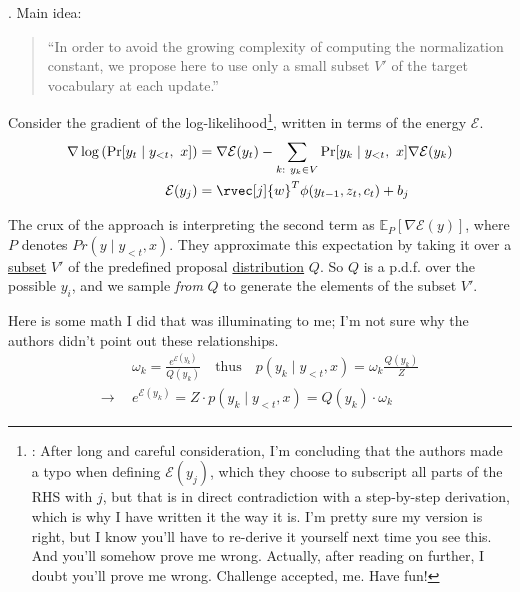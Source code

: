 \documentclass[11pt]{article}
\begin{document}
\myspace
\p {}. Main idea:
\vspace{-1em}
\begin{center}
	\begin{quote}
		{\footnotesize ``In order to avoid the growing complexity of computing the normalization constant, we propose here to use only a small subset $V'$ of the target vocabulary at each update.''}
	\end{quote}
\end{center}
Consider the gradient of the log-likelihood\footnote{: After long and careful consideration, I'm concluding that the authors made a typo when defining $\mathcal{E}(y_j)$, which they choose to subscript all parts of the RHS with $j$, but that is in direct contradiction with a step-by-step derivation, which is why I have written it the way it is. I'm pretty sure my version is right, but I know you'll have to re-derive it yourself next time you see this. And you'll somehow prove me wrong. Actually, after reading on further, I doubt you'll prove me wrong. Challenge accepted, me. Have fun!}, written in terms of the energy $\mathcal{E}$. 
\begin{align}
\nabla \log\left(\Pr[y_t \mid y_{<t}, ~ x]  \right)
&= \nabla \mathcal{E}(y_t) 
- \sum_{k:~y_k\in V}\Pr[y_k \mid y_{<t}, ~ x]\nabla\mathcal{E}(y_k)\\
\mathcal{E}(y_j) &= \rvec[j]{w}^T \phi(y_{t - 1}, z_t, c_t) + b_j
\end{align}


\myspace
\p The crux of the approach is interpreting the second term as $\mathbb{E}_P\left[\nabla \mathcal{E}(y) \right]$, where $P$ denotes $Pr(y \mid y_{<t}, x)$. They approximate this expectation by taking it over a \underline{subset} $V'$ of the predefined proposal \underline{distribution} $Q$. So $Q$ is a p.d.f. over the possible $y_i$, and we sample \textit{from} $Q$ to generate the elements of the subset $V'$. 

Here is some math I did that was illuminating to me; I'm not sure why the authors didn't point out these relationships. 
\begin{align}
&\omega_k = \frac{e^{\mathcal{E}(y_k)}}{Q(y_k)} 
\quad\text{thus}\quad
p(y_k \mid y_{<t}, x) = \omega_k \frac{Q(y_k)}{Z} \\
\rightarrow~~  &e^{\mathcal{E}(y_k)} = Z \cdot p(y_k \mid y_{<t}, x) 
= Q(y_k) \cdot \omega_k
\end{align}
\end{document}
